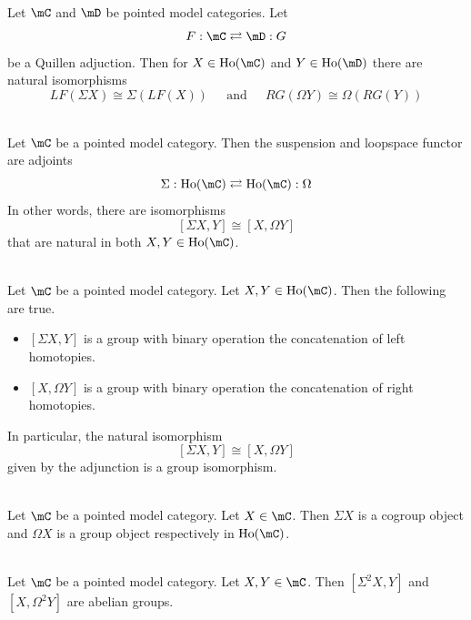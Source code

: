 \documentclass[a4paper]{article}
\begin{document}
\begin{prp}{}{}\\ Let $\mC$ and $\mD$ be pointed model categories. Let $$F:\mC\rightleftarrows\mD:G$$ be a Quillen adjuction. Then for $X\in\text{Ho}(\mC)$ and $Y\in\text{Ho}(\mD)$ there are natural isomorphisms $$LF(\Sigma X)\cong\Sigma(LF(X))\;\;\;\;\text{ and }\;\;\;\; RG(\Omega Y)\cong\Omega(RG(Y))$$
\end{prp}

\begin{thm}{}{}\\ Let $\mC$ be a pointed model category. Then the suspension and loopspace functor are adjoints $$\Sigma:\text{Ho}(\mC)\rightleftarrows\text{Ho}(\mC):\Omega$$ In other words, there are isomorphisms $$[\Sigma X,Y]\cong[X,\Omega Y]$$ that are natural in both $X,Y\in\text{Ho}(\mC)$. 
\end{thm}

\begin{thm}{}{}\\ Let $\mC$ be a pointed model category. Let $X,Y\in\text{Ho}(\mC)$. Then the following are true. 
\begin{itemize}
\item $[\Sigma X,Y]$ is a group with binary operation the concatenation of left homotopies. 
\item $[X,\Omega Y]$ is a group with binary operation the concatenation of right homotopies. 
\end{itemize}
In particular, the natural isomorphism $$[\Sigma X,Y]\cong[X,\Omega Y]$$ given by the adjunction is a group isomorphism. 
\end{thm}

\begin{crl}{}{}\\ Let $\mC$ be a pointed model category. Let $X\in\mC$. Then $\Sigma X$ is a cogroup object and $\Omega X$ is a group object respectively in $\text{Ho}(\mC)$. 
\end{crl}

\begin{crl}{}{}\\ Let $\mC$ be a pointed model category. Let $X,Y\in\mC$. Then $[\Sigma^2 X,Y]$ and $[X,\Omega^2Y]$ are abelian groups. 
\end{crl}
\end{document}
